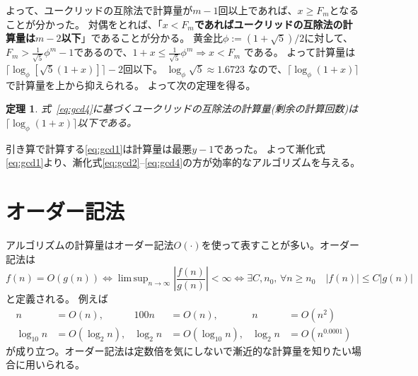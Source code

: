 \documentclass[a4paper,twoside,onecolumn,openany,article,10pt]{memoir}
\newtheorem{theorem}{定理}
\theoremstyle{remark}
\begin{document}
よって、ユークリッドの互除法で計算量が$m-1$回以上であれば、$x\ge F_{m}$となることが分かった。
対偶をとれば、「\textbf{$x <F_{m}$であればユークリッドの互除法の計算量は$m-2$以下}」であることが分かる。
黄金比$\phi:=(1+\sqrt{5})/2$に対して、$F_m> \frac1{\sqrt{5}}\phi^m-1$であるので、$1+x \le \frac1{\sqrt{5}}\phi^{m} \Rightarrow x< F_{m}$ である。
よって計算量は $\lceil\log_\phi[\sqrt{5}(1+x)]\rceil-2$回以下。
$\log_\phi \sqrt{5} \approx 1.6723$ なので、$\lceil\log_\phi (1+x)\rceil$ で計算量を上から抑えられる。
よって次の定理を得る。
\begin{theorem}
式~\eqref{eq:gcd4}に基づくユークリッドの互除法の計算量(剰余の計算回数)は$\lceil\log_\phi(1+x)\rceil$以下である。
\end{theorem}
引き算で計算する\eqref{eq:gcd1}は計算量は最悪$y-1$であった。
よって漸化式\eqref{eq:gcd1}より、漸化式\eqref{eq:gcd2}--\eqref{eq:gcd4}の方が効率的なアルゴリズムを与える。


\section{オーダー記法}
アルゴリズムの計算量はオーダー記法$O(\cdot)$を使って表すことが多い。オーダー記法は
\begin{equation*}
f(n)=O(g(n)) \iff \mathop{\mathrm{lim\,sup}}_{n\to\infty} \left|\frac{f(n)}{g(n)}\right| < \infty
\iff \exists C, n_0,\, \forall n\ge n_0\quad |f(n)|\le C|g(n)|
\end{equation*}
と定義される。
例えば
\begin{align*}
n &= O(n),&
100n &= O(n),&
n &= O(n^2)\\
\log_{10} n &= O(\log_{2} n),&
\log_{2} n &= O(\log_{10} n),&
\log_2 n &= O(n^{0.0001})
\end{align*}
が成り立つ。オーダー記法は定数倍を気にしないで漸近的な計算量を知りたい場合に用いられる。
\end{document}
